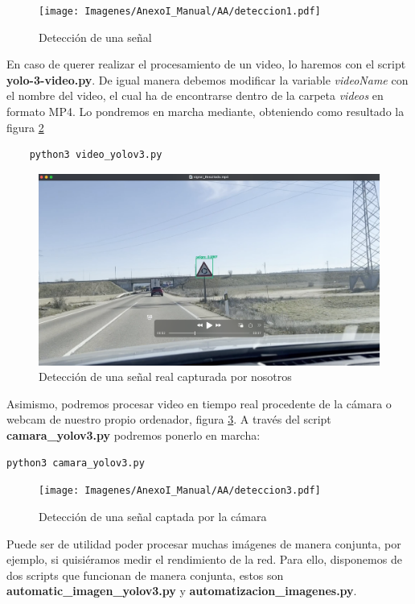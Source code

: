 \begin{figure}[H]
	\centering
	\texttt{[image: Imagenes/AnexoI\_Manual/AA/deteccion1.pdf]}
	\caption{Detección de una señal}
	\label{detecc1}
\end{figure}

En caso de querer realizar el procesamiento de un video, lo haremos con el script \textbf{yolo-3-video.py}. De igual manera debemos modificar la variable \textit{videoName} con el nombre del video, el cual ha de encontrarse dentro de la carpeta \textit{videos} en formato MP4. Lo pondremos en marcha mediante, obteniendo como resultado la figura \ref{detecc2}
\begin{lstlisting}
	python3 video_yolov3.py
\end{lstlisting}
	
\begin{figure}[H]
	\centering
	\includegraphics[width=\textwidth]{Imagenes/AnexoI_Manual/AA/deteccion2.pdf}
	\caption{Detección de una señal real capturada por nosotros}
	\label{detecc2}
\end{figure}

Asimismo, podremos procesar video en tiempo real procedente de la cámara o webcam de nuestro propio ordenador, figura \ref{detecc3}. A través del script \textbf{camara_yolov3.py} podremos ponerlo en marcha:

\begin{lstlisting}
python3 camara_yolov3.py
\end{lstlisting}

\begin{figure}[H]
	\centering
	\texttt{[image: Imagenes/AnexoI\_Manual/AA/deteccion3.pdf]}
	\caption{Detección de una señal captada por la cámara}
	\label{detecc3}
\end{figure}

Puede ser de utilidad poder procesar muchas imágenes de manera conjunta, por ejemplo, si quisiéramos medir el rendimiento de la red. Para ello, disponemos de dos scripts que funcionan de manera conjunta, estos son \textbf{automatic_imagen_yolov3.py} y \textbf{automatizacion_imagenes.py}. 

